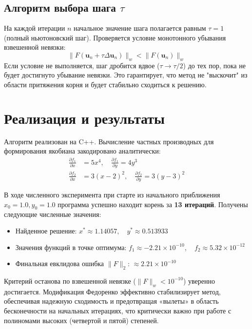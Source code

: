 \documentclass[12pt, a4paper]{article}
\theoremstyle{definition}
\begin{document}
\subsection{Алгоритм выбора шага $\tau$}
На каждой итерации $n$ начальное значение шага полагается равным $\tau = 1$ (полный ньютоновский шаг). Проверяется условие монотонного убывания взвешенной невязки:
\[
\|F(\bm{u}_n + \tau \Delta \bm{u}_n)\|_{w} < \|F(\bm{u}_n)\|_{w}
\]
Если условие не выполняется, шаг дробится вдвое ($\tau \to \tau / 2$) до тех пор, пока не будет достигнуто убывание невязки. Это гарантирует, что метод не "выскочит" из области притяжения корня и будет стабильно сходиться к решению.

\section{Реализация и результаты}
Алгоритм реализован на C++. Вычисление частных производных для формирования якобиана закодировано аналитически:
\begin{align*}
\frac{\partial f_1}{\partial x} &= 5x^4, \quad \frac{\partial f_1}{\partial y} = 4y^3 \\
\frac{\partial f_2}{\partial x} &= 3(x-2)^2, \quad \frac{\partial f_2}{\partial y} = 3(y-3)^2
\end{align*}

В ходе численного эксперимента при старте из начального приближения $x_0 = 1.0, y_0 = 1.0$ программа успешно находит корень за \textbf{13 итераций}. Получены следующие численные значения:
\begin{itemize}
    \item Найденное решение: $x^* \approx 1.14057, \quad y^* \approx 0.513933$
    \item Значения функций в точке оптимума: $f_1 \approx -2.21 \times 10^{-10}, \quad f_2 \approx 5.32 \times 10^{-12}$
    \item Финальная евклидова ошибка $\|F\|_2$: $\approx 2.21 \times 10^{-10}$
\end{itemize}

Критерий останова по взвешенной невязке ($\|F\|_w < 10^{-10}$) уверенно достигается. Модификация Федоренко эффективно стабилизирует метод, обеспечивая надежную сходимость и предотвращая «вылеты» в область бесконечности на начальных итерациях, что критически важно при работе с полиномами высоких (четвертой и пятой) степеней.
\end{document}
